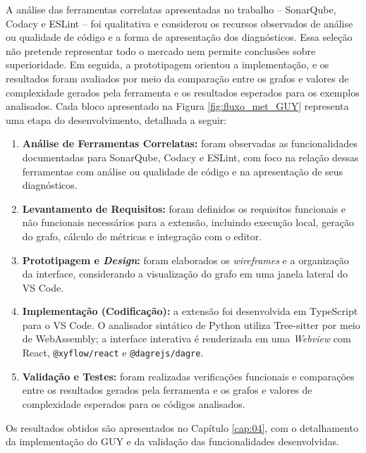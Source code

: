 A análise das ferramentas correlatas apresentadas no trabalho -- SonarQube, Codacy e ESLint -- foi qualitativa e considerou os recursos observados de análise ou qualidade de código e a forma de apresentação dos diagnósticos. Essa seleção não pretende representar todo o mercado nem permite conclusões sobre superioridade. Em seguida, a prototipagem orientou a implementação, e os resultados foram avaliados por meio da comparação entre os grafos e valores de complexidade gerados pela ferramenta e os resultados esperados para os exemplos analisados. Cada bloco apresentado na Figura \ref{fig:fluxo_met_GUY} representa uma etapa do desenvolvimento, detalhada a seguir:

\begin{enumerate}
\item \textbf{Análise de Ferramentas Correlatas:} foram observadas as funcionalidades documentadas para SonarQube, Codacy e ESLint, com foco na relação dessas ferramentas com análise ou qualidade de código e na apresentação de seus diagnósticos.
\item \textbf{Levantamento de Requisitos:} foram definidos os requisitos funcionais e não funcionais necessários para a extensão, incluindo execução local, geração do grafo, cálculo de métricas e integração com o editor.
\item \textbf{Prototipagem e \textit{Design}:} foram elaborados os \textit{wireframes} e a organização da interface, considerando a visualização do grafo em uma janela lateral do VS Code.
\item \textbf{Implementação (Codificação):} a extensão foi desenvolvida em TypeScript para o VS Code. O analisador sintático de Python utiliza Tree-sitter por meio de WebAssembly; a interface interativa é renderizada em uma \textit{Webview} com React, \texttt{@xyflow/react} e \texttt{@dagrejs/dagre}.
\item \textbf{Validação e Testes:} foram realizadas verificações funcionais e comparações entre os resultados gerados pela ferramenta e os grafos e valores de complexidade esperados para os códigos analisados.
\end{enumerate}

Os resultados obtidos são apresentados no Capítulo \ref{cap:04}, com o detalhamento da implementação do GUY e da validação das funcionalidades desenvolvidas.
